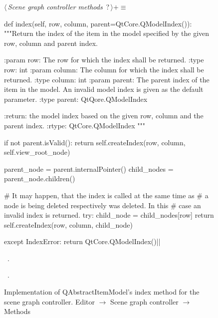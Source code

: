\documentclass[%
    a4paper,    %
    justified,  %
    nobib,      %
    openany     %
]{tufte-book}
\makeatletter
\renewcommand{\label}[1]{\@tufte@label{##1}}%
\makeatother
\begin{document}
\begin{figure}
\begin{flushleft} \small
\begin{minipage}{\linewidth}\label{scrap31}\raggedright\small
{} $\langle\,${\itshape Scene graph controller methods}\nobreak\ {\footnotesize {?}}$\,\rangle+\equiv$
\vspace{-1ex}
\begin{pythoncode}
def index(self, row, column, parent=QtCore.QModelIndex()):
    """Return the index of the item in the model specified by the
    given row, column and parent index.

    :param row: The row for which the index shall be returned.
    :type  row: int
    :param column: The column for which the index shall be
                   returned.
    :type column:  int
    :param parent: The parent index of the item in the model. An
                   invalid model index is given as the default
                   parameter.
    :type parent: QtQore.QModelIndex

    :return: the model index based on the given row, column and
             the parent index.
    :rtype: QtCore.QModelIndex
    """

    if not parent.isValid():
        return self.createIndex(row, column, self.view_root_node)

    parent_node = parent.internalPointer()
    child_nodes = parent_node.children()

    # It may happen, that the index is called at the same time as
    # a node is being deleted respectively was deleted. In this
    # case an invalid index is returned.
    try:
        child_node  = child_nodes[row]
        return self.createIndex(row, column, child_node)

    except IndexError:
        return QtCore.QModelIndex()|\NWsep|
\end{pythoncode}
\vspace{1.5ex}
\footnotesize
\begin{list}{}{\setlength{\itemsep}{-\parsep}\setlength{\itemindent}{-\leftmargin}}
\item \NWtxtMacroDefBy\ .
\item \NWtxtMacroRefIn\ .

\item{}
\end{list}
\end{minipage}\vspace{4ex}
\end{flushleft}
\caption{Implementation of QAbstractItemModel's index method for the scene graph
  controller.
  \newline{}\newline{}Editor $\rightarrow$ Scene graph controller $\rightarrow$
  Methods}
\label{editor:lst:scene-graph-controller:methods:index}
\end{figure}
\end{document}
